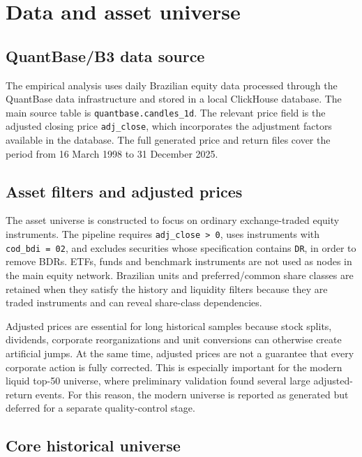 \section{Data and asset universe}
\label{sec:data}

\subsection{QuantBase/B3 data source}

The empirical analysis uses daily Brazilian equity data processed through the QuantBase data infrastructure and stored in a local ClickHouse database. The main source table is \texttt{quantbase.candles\_1d}. The relevant price field is the adjusted closing price \texttt{adj\_close}, which incorporates the adjustment factors available in the database. The full generated price and return files cover the period from 16 March 1998 to 31 December 2025.

\subsection{Asset filters and adjusted prices}

The asset universe is constructed to focus on ordinary exchange-traded equity instruments. The pipeline requires \texttt{adj\_close > 0}, uses instruments with \texttt{cod\_bdi = 02}, and excludes securities whose specification contains \texttt{DR}, in order to remove BDRs. ETFs, funds and benchmark instruments are not used as nodes in the main equity network. Brazilian units and preferred/common share classes are retained when they satisfy the history and liquidity filters because they are traded instruments and can reveal share-class dependencies.

Adjusted prices are essential for long historical samples because stock splits, dividends, corporate reorganizations and unit conversions can otherwise create artificial jumps. At the same time, adjusted prices are not a guarantee that every corporate action is fully corrected. This is especially important for the modern liquid top-50 universe, where preliminary validation found several large adjusted-return events. For this reason, the modern universe is reported as generated but deferred for a separate quality-control stage.

\subsection{Core historical universe}

